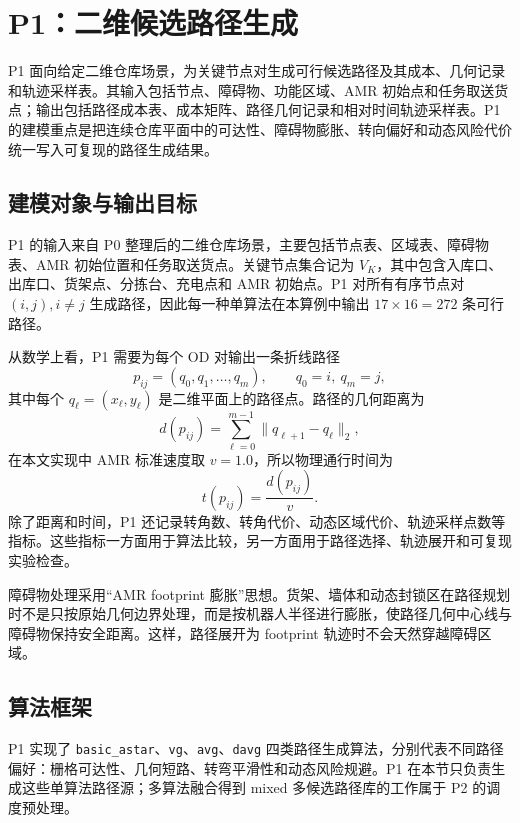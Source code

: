 \section{P1：二维候选路径生成}

P1 面向给定二维仓库场景，为关键节点对生成可行候选路径及其成本、几何记录和轨迹采样表。其输入包括节点、障碍物、功能区域、AMR 初始点和任务取送货点；输出包括路径成本表、成本矩阵、路径几何记录和相对时间轨迹采样表。P1 的建模重点是把连续仓库平面中的可达性、障碍物膨胀、转向偏好和动态风险代价统一写入可复现的路径生成结果。

\subsection{建模对象与输出目标}

P1 的输入来自 P0 整理后的二维仓库场景，主要包括节点表、区域表、障碍物表、AMR 初始位置和任务取送货点。关键节点集合记为 $V_K$，其中包含入库口、出库口、货架点、分拣台、充电点和 AMR 初始点。P1 对所有有序节点对 $(i,j), i\neq j$ 生成路径，因此每一种单算法在本算例中输出 $17\times 16=272$ 条可行路径。

从数学上看，P1 需要为每个 OD 对输出一条折线路径
\[
  p_{ij} = (q_0,q_1,\ldots,q_m),\qquad q_0=i,\ q_m=j,
\]
其中每个 $q_\ell=(x_\ell,y_\ell)$ 是二维平面上的路径点。路径的几何距离为
\[
  d(p_{ij})=\sum_{\ell=0}^{m-1}\|q_{\ell+1}-q_\ell\|_2,
\]
在本文实现中 AMR 标准速度取 $v=1.0$，所以物理通行时间为
\[
  t(p_{ij})=\frac{d(p_{ij})}{v}.
\]
除了距离和时间，P1 还记录转角数、转角代价、动态区域代价、轨迹采样点数等指标。这些指标一方面用于算法比较，另一方面用于路径选择、轨迹展开和可复现实验检查。

障碍物处理采用“AMR footprint 膨胀”思想。货架、墙体和动态封锁区在路径规划时不是只按原始几何边界处理，而是按机器人半径进行膨胀，使路径几何中心线与障碍物保持安全距离。这样，路径展开为 footprint 轨迹时不会天然穿越障碍区域。

\subsection{算法框架}

P1 实现了 \verb|basic_astar|、\verb|vg|、\verb|avg|、\verb|davg| 四类路径生成算法，分别代表不同路径偏好：栅格可达性、几何短路、转弯平滑性和动态风险规避。P1 在本节只负责生成这些单算法路径源；多算法融合得到 mixed 多候选路径库的工作属于 P2 的调度预处理。

